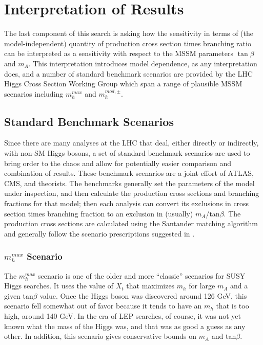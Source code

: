 

\chapter[Interpretation]{Interpretation of Results}

The last component of this search is asking how the sensitivity in terms of 
(the model-independent) quantity of production cross section times branching ratio
can be interpreted as a sensitivity with respect to the MSSM parameters $\tan\beta$
and $m_A$.  This interpretation introduces model dependence, as any interpretation does,
and a number of standard benchmark scenarios
are provided by the LHC Higgs Cross Section Working Group \cite{mssm_xsec_wg} which span 
a range of plausible MSSM scenarios including $m_h^{max}$ and $m_h^{mod,\pm}$. 

\section{Standard Benchmark Scenarios}
\label{sec:interp_benchmark}
Since there are many analyses at the LHC that deal, either directly or indirectly,
with non-SM Higgs bosons, a set of standard benchmark scenarios are used to bring
order to the chaos and allow for potentially easier comparison and combination 
of results.  These benchmark scenarios are a joint effort of ATLAS, CMS, and 
theorists.  The benchmarks generally set the parameters of the model under inspection,
and then calculate the production cross sections and branching fractions for that
model; then each analysis can convert its exclusions in cross section times 
branching fraction to an exclusion in (usually) $m_A$/tan$\beta$.  The production
cross sections are calculated using the Santander matching algorithm \cite{santander} 
and generally follow the scenario prescriptions suggested in \cite{Carena-2}.

\subsection{$m_h^{max}$ Scenario}
The $m_h^{max}$ scenario is one of the older and more ``classic'' scenarios for 
SUSY Higgs searches.  It uses the value of $X_t$ that maximizes
$m_h$ for large $m_A$ and a given tan$\beta$ value.  Once the Higgs boson was discovered
around 126 GeV, this scenario fell somewhat out of favor because it tends to have an $m_h$ that
is too high, around 140 GeV.  In the era of LEP searches, of course, it was not yet known
what the mass of the Higgs was, and that was as good a guess as any other.  In addition,
this scenario gives conservative bounds on $m_A$ and tan$\beta$.

